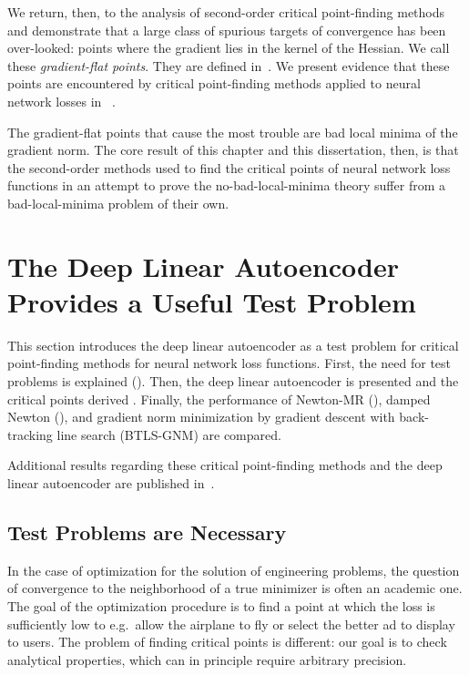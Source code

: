 \documentclass[../../thesis.tex]{subfiles}
\begin{document}
We return, then, to the analysis of second-order
critical point-finding methods and demonstrate
that a large class of spurious targets of convergence
has been over-looked:
points where the gradient lies in the kernel of the Hessian.
We call these \emph{gradient-flat points}.
They are defined in~.
We present evidence that these points are encountered
by critical point-finding methods applied to neural network losses in%
~.

The gradient-flat points that cause the most trouble are
bad local minima of the gradient norm.
The core result of this chapter
and this dissertation, then,
is that the second-order methods
used to find the critical points
of neural network loss functions
in an attempt to prove the no-bad-local-minima theory
suffer from a bad-local-minima problem of their own.

\section{The Deep Linear Autoencoder Provides a Useful Test Problem}%

This section introduces the deep linear autoencoder
as a test problem for critical point-finding methods
for neural network loss functions.
First,
the need for test problems is explained
().
Then,
the deep linear autoencoder is presented
and the critical points derived
.
Finally, the performance of
Newton-MR (),
damped Newton (),
and gradient norm minimization by
gradient descent with back-tracking line search
(BTLS-GNM)
are compared.

Additional results regarding these critical point-finding methods
and the deep linear autoencoder are
published in~\cite{frye2019}.

\subsection{Test Problems are Necessary}%

In the case of optimization for the solution of engineering problems,
the question of convergence to the neighborhood of a true minimizer
is often an academic one.
The goal of the optimization procedure is to find a point
at which the loss is sufficiently low to
e.g.~allow the airplane to fly
or select the better ad to display to users.
The problem of finding critical points is different:
our goal is to check analytical properties,
which can in principle require arbitrary precision.
\end{document}
